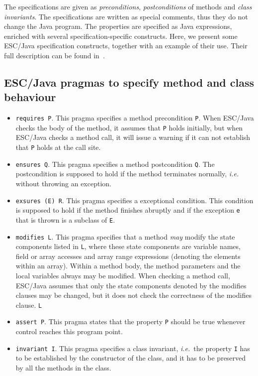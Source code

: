 \documentclass[a4paper]{llncs}
\begin{document}
The specifications are given as
\textit{preconditions}, \textit{postconditions} of methods and 
\textit{class
invariants}. The specifications are written as special comments, thus
they do not change the Java program.  The properties are specified as
Java expressions, enriched with several specification-specific
constructs. Here, we present some ESC/Java specification constructs,
together with an example of their use. Their full description can be
found in~\cite{LeinoNS00}.

\subsection{ESC/Java pragmas to specify method and class behaviour}
\begin{itemize}
\item{\texttt{requires P}.}
This pragma specifies a method precondition {\tt P}.
When ESC/Java checks the body of the
method, it assumes that \texttt{P} holds initially, but when
ESC/Java checks a method call, it will issue a warning if
it can not establish that \texttt{P} holds at the call site.

\item{\texttt{ensures Q}.}
This pragma specifies a method postcondition \texttt{Q}. The
postcondition is supposed to hold if the method terminates normally,
\emph{i.e.}  without throwing an exception.

\item{\texttt{exsures (E) R}.}
This pragma specifies a exceptional condition. This condition is
supposed to hold if the method finishes abruptly and if
the exception \texttt{e} that is thrown is a subclass of \texttt{E}.

\item{\texttt{modifies L}.}
This pragma specifies that a method \emph{may} modify the state
components listed in \texttt{L}, where these state components are
variable names, field or array accesses and array range expressions
(denoting the elements within an array). Within a method body, the
method parameters and the local variables always may be modified. When
checking a method call, ESC/Java assumes that only the state
components denoted by the modifies clauses may be changed, but it
does not check the correctness of the modifies clause.
\texttt{L}

\item{\texttt{assert P}.} This pragma states that the property
\texttt{P} should be true whenever control reaches this program point.

\item{\texttt{invariant I}.} This pragma specifies a class invariant,
\emph{i.e.}~the property \texttt{I} has to be established by the
constructor of the class, and it has to be preserved by all the
methods in the class. 
\end{itemize}
\end{document}
